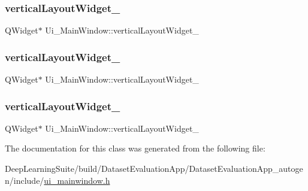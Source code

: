 \subsubsection{\texorpdfstring{vertical\+Layout\+Widget\+\_}{verticalLayoutWidget\_7}}
{\footnotesize\ttfamily Q\+Widget$\ast$ Ui\+\_\+\+Main\+Window\+::vertical\+Layout\+Widget\+\_}

\mbox{\label{class_ui___main_window_ad8004b01946b6868d7b39be5e1bb649c}} 
\subsubsection{\texorpdfstring{vertical\+Layout\+Widget\+\_}{verticalLayoutWidget\_8}}
{\footnotesize\ttfamily Q\+Widget$\ast$ Ui\+\_\+\+Main\+Window\+::vertical\+Layout\+Widget\+\_}

\mbox{\label{class_ui___main_window_a2f44615c80d2a1c4cf6add71e4505368}} 
\subsubsection{\texorpdfstring{vertical\+Layout\+Widget\+\_}{verticalLayoutWidget\_9}}
{\footnotesize\ttfamily Q\+Widget$\ast$ Ui\+\_\+\+Main\+Window\+::vertical\+Layout\+Widget\+\_}



The documentation for this class was generated from the following file\+:\begin{DoxyCompactItemize}
\item 
Deep\+Learning\+Suite/build/\+Dataset\+Evaluation\+App/\+Dataset\+Evaluation\+App\+\_\+autogen/include/\hyperlink{ui__mainwindow_8h}{ui\+\_\+mainwindow.\+h}\end{DoxyCompactItemize}
